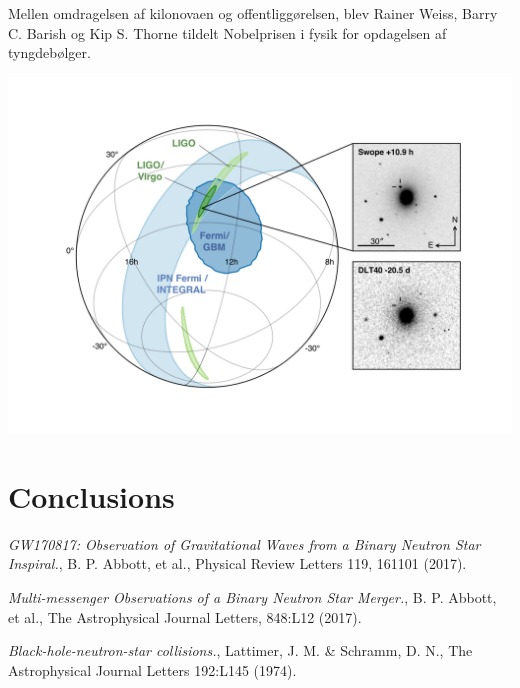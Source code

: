 \documentclass[twocolumn]{article}
\begin{document}
Mellen omdragelsen af kilonovaen og offentliggørelsen, blev Rainer Weiss, Barry C. Barish og Kip S. Thorne tildelt Nobelprisen i fysik for opdagelsen af tyngdebølger. 

\begin{center}
\includegraphics[width=\columnwidth]{GW170817_MMA_Skymap}
\end{center}








\section{Conclusions}\label{conclusions}




\begin{thebibliography}{9}
 \emph{GW170817: Observation of Gravitational Waves from a Binary Neutron Star Inspiral.},
B. P. Abbott, et al., Physical Review Letters 119, 161101 (2017).

 \emph{Multi-messenger Observations of a Binary Neutron Star Merger.},
B. P. Abbott, et al., The Astrophysical Journal Letters, 848:L12 (2017).

 \emph{Black-hole-neutron-star collisions.},
Lattimer, J. M. \& Schramm, D. N., The Astrophysical Journal Letters 192:L145 (1974).
\end{thebibliography}
\end{document}

